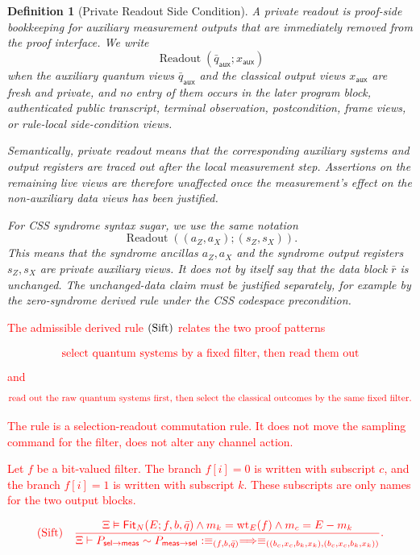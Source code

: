 \documentclass[acmsmall,screen,review,anonymous,nonacm]{acmart}
\newtheorem{definition}{Definition}[section]
\theoremstyle{defn_style}
\begin{document}
\begin{definition}[Private Readout Side Condition]
A private readout is proof-side bookkeeping for auxiliary measurement outputs
that are immediately removed from the proof interface. We write
\[
\operatorname{Readout}(\bar q_{\mathsf{aux}};x_{\mathsf{aux}})
\]
when the auxiliary quantum views \(\bar q_{\mathsf{aux}}\) and the classical
output views \(x_{\mathsf{aux}}\) are fresh and private, and no entry of them
occurs in the later program block, authenticated public transcript, terminal
observation, postcondition, frame views, or rule-local side-condition views.

Semantically, private readout means that the corresponding auxiliary systems
and output registers are traced out after the local measurement step. Assertions
on the remaining live views are therefore unaffected once the measurement's
effect on the non-auxiliary data views has been justified.

For CSS syndrome syntax sugar, we use the same notation
\[
\operatorname{Readout}((a_Z,a_X);(s_Z,s_X)).
\]
This means that the syndrome ancillas \(a_Z,a_X\) and the syndrome output
registers \(s_Z,s_X\) are private auxiliary views. It does not by itself say
that the data block \(\bar r\) is unchanged. The unchanged-data claim must be
justified separately, for example by the zero-syndrome derived rule under the
CSS codespace precondition.
\end{definition}

\textcolor{red}{The admissible derived rule \({\rm (Sift)}\) relates the two proof patterns}

\[
\textcolor{red}{
\text{select quantum systems by a fixed filter, then read them out}
}
\]
\textcolor{red}{and}
\[
\textcolor{red}{
\text{read out the raw quantum systems first, then select the classical
outcomes by the same fixed filter}.
}
\]

\textcolor{red}{The rule is a selection-readout commutation rule. It does not move the
sampling command for the filter, does not alter any channel action.}

\textcolor{red}{Let \(f\) be a bit-valued filter. The branch \(f[i]=0\) is written with subscript \(c\), and the branch \(f[i]=1\) is written with subscript \(k\). These subscripts are only names for the two output blocks.}

\[
\textcolor{red}{
\text{\rm (Sift)}
\quad
\frac{
\Xi\vDash
\mathsf{Fit}_N(E;f,b,\bar q)
\land
m_k=\operatorname{wt}_{E}(f)
\land
m_c=E-m_k
}{
\Xi
\vdash
P_{\mathsf{sel}\to\mathsf{meas}}
\sim
P_{\mathsf{meas}\to\mathsf{sel}}
:
\equiv_{(f,b,\bar q)}
\Longrightarrow
\equiv_{((b_c,x_c,b_k,x_k),(b_c,x_c,b_k,x_k))}
}.
}
\]
\end{document}
